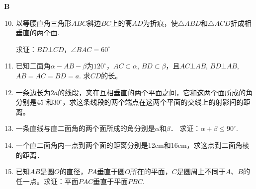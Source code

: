 \begin{center}
    \bfseries B
\end{center}

\begin{enumerate}\setcounter{enumi}{9}
    \item 以等腰直角三角形$ABC$斜边$BC$上的高$AD$为折痕，使$\triangle ABD$和$\triangle ACD$折成相垂直的两个面.
    
求证：$BD\bot CD$，$\angle BAC=60^{\circ}$
\item 已知二面角$\alpha-AB-\beta$为$120^{\circ}$，$AC\subset \alpha$, $BD\subset \beta$，且$AC\bot AB$, $BD\bot AB$, $AB=AC=BD=a$. 求$CD$的长。
\item 一条边长为$2a$的线段，夹在互相垂直的两个平面之间，它和这两个面所成的角分别是$45^{\circ}$和$30^{\circ}$，求这条线段的两个端点在这两个平面的交线上的射影间的距离。
\item 一条直线与直二面角的两个面所成的角分别是$\alpha$和$\beta$．
求证：$\alpha+\beta\le 90^{\circ}$. 
\item 一个直二面角内一点到两个面的距离分别是12cm和16cm，求这点到二面角棱的距离．
\item 已知$AB$是圆$O$的直径，$PA$垂直于圆$O$所在的平面，$C$是圆周上不同于$A$、$B$的任一点。求证：平面$PAC$垂直于平面$PBC$.
\end{enumerate}

